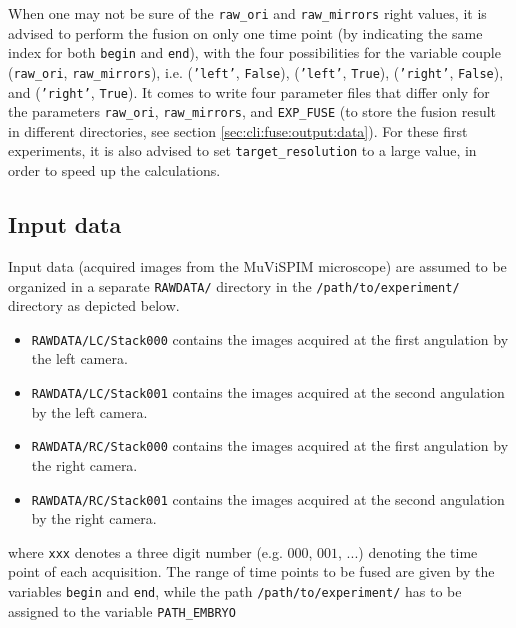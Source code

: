 When one may not be sure of the \texttt{raw\_ori} and
\texttt{raw\_mirrors} right values, it is advised to perform the
fusion on only one time point (by indicating the same index for both
\texttt{begin}  and \texttt{end}), with the four possibilities for the
variable couple (\texttt{raw\_ori}, \texttt{raw\_mirrors}), i.e.
(\texttt{'left'}, \texttt{False}),
(\texttt{'left'}, \texttt{True}),
(\texttt{'right'}, \texttt{False}), and
(\texttt{'right'}, \texttt{True}).
It comes to write four parameter files that differ only for the
parameters \texttt{raw\_ori}, \texttt{raw\_mirrors}, and
\texttt{EXP\_FUSE}  (to store the fusion result in different
directories, see section \ref{sec:cli:fuse:output:data}).
For these first experiments, it is also advised to set
\texttt{target\_resolution} to a large value, in order to speed up the
calculations.



\subsection{Input data}
\label{sec:cli:fuse:input:data}

Input data (acquired images from the MuViSPIM microscope) are assumed
to be organized in a separate \texttt{RAWDATA/} directory in the 
\texttt{/path/to/experiment/} directory as depicted below. 
\begin{itemize}
  \itemsep -1ex
\item \texttt{RAWDATA/LC/Stack000} contains the images acquired at the
  first angulation by the left camera.
\item \texttt{RAWDATA/LC/Stack001} contains the images acquired at the
  second angulation by the left camera.
\item \texttt{RAWDATA/RC/Stack000} contains the images acquired at the
  first angulation by the right camera.
\item \texttt{RAWDATA/RC/Stack001} contains the images acquired at the
  second angulation by the right camera.
\end{itemize}

\mbox{}
\mbox{}

where \texttt{xxx} denotes a three digit number (e.g. $000$, $001$,
...) denoting the time point of each acquisition. The range of time
points to be fused are given by the variables \texttt{begin} and
\texttt{end}, while the path \texttt{/path/to/experiment/} has to be
assigned to the variable \texttt{PATH\_EMBRYO} 

